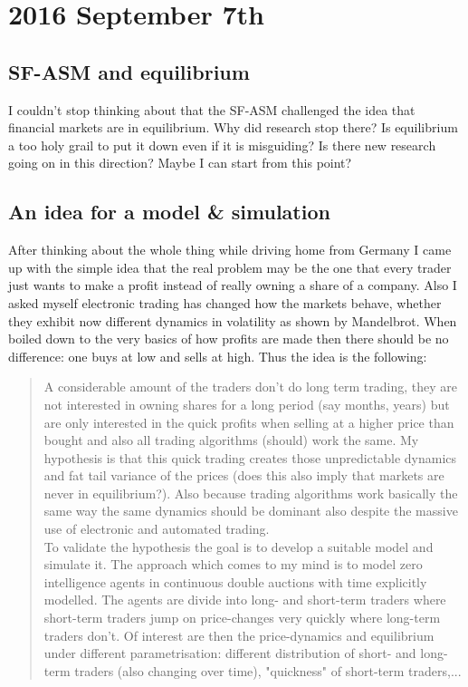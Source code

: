\section*{2016 September 7th}

\subsection*{SF-ASM and equilibrium}
I couldn't stop thinking about that the SF-ASM challenged the idea that financial markets are in equilibrium. Why did research stop there? Is equilibrium a too holy grail to put it down even if it is misguiding? Is there new research going on in this direction? Maybe I can start from this point?

\subsection*{An idea for a model \& simulation}
After thinking about the whole thing while driving home from Germany I came up with the simple idea that the real problem may be the one that every trader just wants to make a profit instead of really owning a share of a company. Also I asked myself electronic trading has changed how the markets behave, whether they exhibit now different dynamics in volatility as shown by Mandelbrot. When boiled down to the very basics of how profits are made then there should be no difference: one buys at low and sells at high. Thus the idea is the following:

\begin{quote}
A considerable amount of the traders don't do long term trading, they are not interested in owning shares for a long period (say months, years) but are only interested in the quick profits when selling at a higher price than bought and also all trading algorithms (should) work the same. My hypothesis is that this quick trading creates those unpredictable dynamics and fat tail variance of the prices (does this also imply that markets are never in equilibrium?). Also because trading algorithms work basically the same way the same dynamics should be dominant also despite the massive use of electronic and automated trading. \\
To validate the hypothesis the goal is to develop a suitable model and simulate it. The approach which comes to my mind is to model zero intelligence agents in continuous double auctions with time explicitly modelled. The agents are divide into long- and short-term traders where short-term traders jump on price-changes very quickly where long-term traders don't. Of interest are then the price-dynamics and equilibrium under different parametrisation: different distribution of short- and long-term traders (also changing over time), "quickness" of short-term traders,...
\end{quote}

